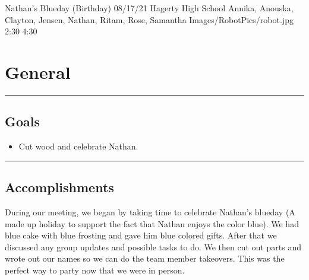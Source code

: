\insertmeeting 
	{Nathan's Blueday (Birthday)} 
	{08/17/21}
	{Hagerty High School}
	{Annika, Anouska, Clayton, Jensen, Nathan, Ritam, Rose, Samantha}
	{Images/RobotPics/robot.jpg}
	{2:30}
  {4:30}
	
\section*{General}
\noindent\hfil\rule{\textwidth}{.4pt}\hfil
\subsection*{Goals}
\begin{itemize}
    \item Cut wood and celebrate Nathan.

\end{itemize} 

\noindent\hfil\rule{\textwidth}{.4pt}\hfil

\subsection*{Accomplishments}
During our meeting, we began by taking time to celebrate Nathan's blueday (A made up holiday to support the fact that Nathan enjoys the color blue). We had blue cake with blue frosting and gave him blue colored gifts. After that we discussed any group updates and possible tasks to do. We then cut out parts and wrote out our names so we can do the team member takeovers. This was the perfect way to party now that we were in person.